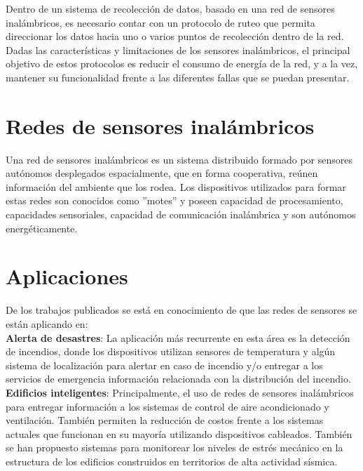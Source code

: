 Dentro de un sistema de recolección de datos, basado en una red de sensores inalámbricos, es necesario contar con un protocolo de ruteo que permita direccionar los datos hacia uno o varios puntos de recolección dentro de la red. Dadas las características y limitaciones de los sensores inalámbricos, el principal objetivo de estos protocolos es reducir el consumo de energía de la red, y a la vez, mantener su funcionalidad frente a las diferentes fallas que se puedan presentar\cite{WSNSurvey}.\\

\section{Redes de sensores inalámbricos}
Una red de sensores inalámbricos es un sistema distribuido formado por sensores autónomos desplegados espacialmente, que en forma cooperativa, reúnen información del ambiente que los rodea. Los dispositivos utilizados para formar estas redes son conocidos como ''motes'' y poseen capacidad de procesamiento, capacidades sensoriales, capacidad de comunicación inalámbrica y son autónomos energéticamente.

\section{Aplicaciones}
De los trabajos publicados se está en conocimiento de que las redes de sensores se están aplicando en\cite{WileyWSN}: \\

\textbf{Alerta de desastres}: La aplicación más recurrente en esta área es la detección de incendios, donde los dispositivos utilizan sensores de temperatura y algún sistema de localización para alertar en caso de incendio y/o entregar a los servicios de emergencia información relacionada con la distribución del incendio.\\

\textbf{Edificios inteligentes}: Principalmente, el uso de redes de sensores inalámbricos para entregar información a los sistemas de control de aire acondicionado y ventilación. También permiten la reducción de costos frente a los sistemas actuales que funcionan en su mayoría utilizando dispositivos cableados. También se han propuesto sistemas para monitorear los niveles de estrés mecánico en la estructura de los edificios construidos en territorios de alta actividad sísmica.\\


